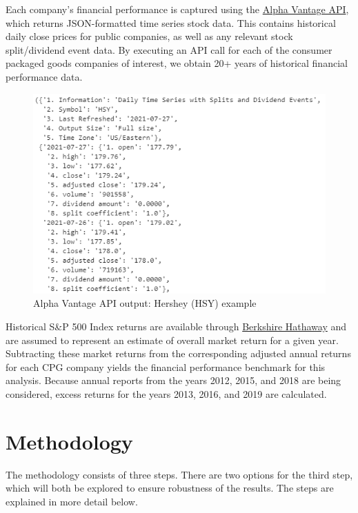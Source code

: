 \documentclass{article}
\begin{document}
Each company's financial performance is captured using the \href{https://www.alphavantage.co/}{Alpha Vantage API}, which returns JSON-formatted time series stock data. This contains historical daily close prices for public companies, as well as any relevant stock split/dividend event data. By executing an API call for each of the consumer packaged goods companies of interest, we obtain 20+ years of historical financial performance data. 

\begin{figure}[ht]
    \centering
    \includegraphics[width = 0.6\linewidth]{AlphaVantage_HSY}
    \caption{Alpha Vantage API output: Hershey (HSY) example}
    \label{fig:AlphaVantage_HSY}
\end{figure}

Historical S\&P 500 Index returns are available through \href{https://www.berkshirehathaway.com/letters/2019ltr.pdf}{Berkshire Hathaway} and are assumed to represent an estimate of overall market return for a given year. Subtracting these market returns from the corresponding adjusted annual returns for each CPG company yields the financial performance benchmark for this analysis. Because annual reports from the years 2012, 2015, and 2018 are being considered, excess returns for the years 2013, 2016, and 2019 are calculated. 

\clearpage
\section{Methodology}
The methodology consists of three steps. There are two options for the third step, which will both be explored to ensure robustness of the results. The steps are explained in more detail below.
\end{document}

